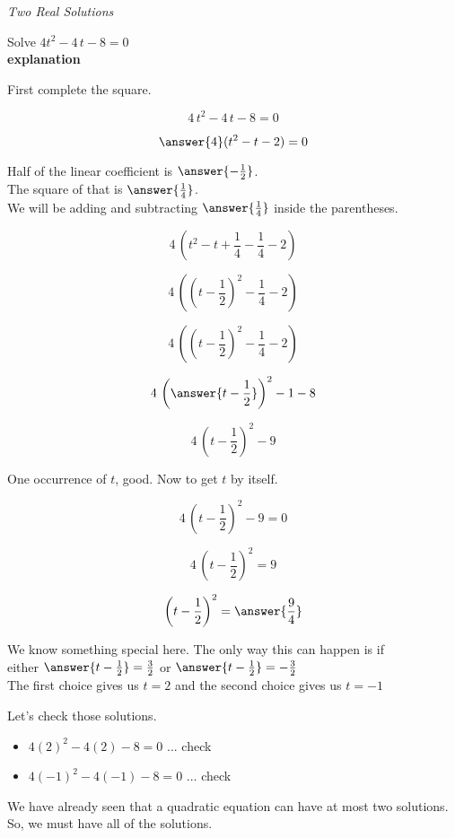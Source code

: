 \documentclass{ximera}
\begin{document}
\begin{example} \textit{Two Real Solutions}

Solve $4  t^2 - 4 \, t - 8 = 0$ \\


\textbf{\textcolor{red!75!green}{explanation}} 


First complete the square.



\[ 4 \, t^2 -  4 \, t - 8 = 0 \]

\[ \answer{4} (t^2 - t - 2) = 0 \]



Half of the linear coefficient is $\answer{-\frac{1}{2}}$. \\

The square of that is $\answer{\frac{1}{4}}$. \\

We will be adding and subtracting $\answer{\frac{1}{4}}$ inside the parentheses.




\[ 4 \, (t^2 - t + \frac{1}{4} - \frac{1}{4} - 2)  \]


\[ 4 \, \left(\left(t - \frac{1}{2}\right)^2 - \frac{1}{4} - 2\right)  \]


\[ 4 \, \left(\left(t - \frac{1}{2}\right)^2 - \frac{1}{4} - 2\right)  \]

\[ 4 \, \left( \answer{t - \frac{1}{2}} \right)^2 - 1 - 8  \]

\[ 4 \, \left(t - \frac{1}{2}\right)^2 - 9  \]


One occurrence of $t$, good. Now to get $t$ by itself.

\[ 4 \, \left(t - \frac{1}{2}\right)^2 - 9 = 0  \]

\[ 4 \, \left(t - \frac{1}{2}\right)^2 = 9  \]

\[  \left(t - \frac{1}{2}\right)^2 = \answer{\frac{9}{4}}  \]

We know something special here. The only way this can happen is if \\



either   $\answer{t - \frac{1}{2}} = \frac{3}{2}$  or  $\answer{t - \frac{1}{2}} = -\frac{3}{2}$ \\

The first choice gives us $t = 2$ and the second choice gives us $t = -1$




Let's check those solutions.

\begin{itemize}
\item $4 (2)^2 - 4 (2) - 8 = 0$ ... check
\item $4 (-1)^2 - 4 (-1) - 8 = 0$ ... check
\end{itemize}



We have already seen that a quadratic equation can have at most two solutions.  So, we must have all of the solutions.




\end{example}
\end{document}
